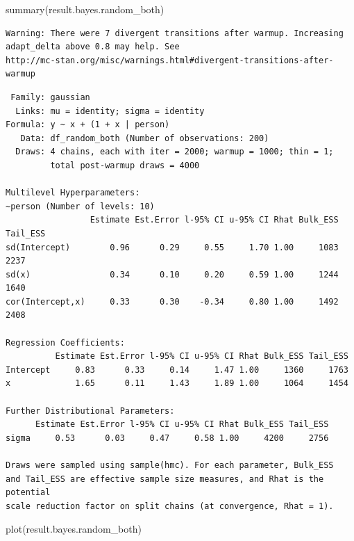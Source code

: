 \documentclass[
  a4paper,
]{ltjsbook}
\newenvironment{Shaded}{\begin{snugshade}}{\end{snugshade}}
\newcommand{\FunctionTok}[1]{\textcolor[rgb]{0.28,0.35,0.67}{#1}}
\newcommand{\NormalTok}[1]{\textcolor[rgb]{0.00,0.23,0.31}{#1}}
\begin{document}
\begin{Shaded}
\begin{Highlighting}[]
\FunctionTok{summary}\NormalTok{(result.bayes.random\_both)}
\end{Highlighting}
\end{Shaded}

\begin{verbatim}
Warning: There were 7 divergent transitions after warmup. Increasing
adapt_delta above 0.8 may help. See
http://mc-stan.org/misc/warnings.html#divergent-transitions-after-warmup
\end{verbatim}

\begin{verbatim}
 Family: gaussian 
  Links: mu = identity; sigma = identity 
Formula: y ~ x + (1 + x | person) 
   Data: df_random_both (Number of observations: 200) 
  Draws: 4 chains, each with iter = 2000; warmup = 1000; thin = 1;
         total post-warmup draws = 4000

Multilevel Hyperparameters:
~person (Number of levels: 10) 
                 Estimate Est.Error l-95% CI u-95% CI Rhat Bulk_ESS Tail_ESS
sd(Intercept)        0.96      0.29     0.55     1.70 1.00     1083     2237
sd(x)                0.34      0.10     0.20     0.59 1.00     1244     1640
cor(Intercept,x)     0.33      0.30    -0.34     0.80 1.00     1492     2408

Regression Coefficients:
          Estimate Est.Error l-95% CI u-95% CI Rhat Bulk_ESS Tail_ESS
Intercept     0.83      0.33     0.14     1.47 1.00     1360     1763
x             1.65      0.11     1.43     1.89 1.00     1064     1454

Further Distributional Parameters:
      Estimate Est.Error l-95% CI u-95% CI Rhat Bulk_ESS Tail_ESS
sigma     0.53      0.03     0.47     0.58 1.00     4200     2756

Draws were sampled using sample(hmc). For each parameter, Bulk_ESS
and Tail_ESS are effective sample size measures, and Rhat is the potential
scale reduction factor on split chains (at convergence, Rhat = 1).
\end{verbatim}

\begin{Shaded}
\begin{Highlighting}[]
\FunctionTok{plot}\NormalTok{(result.bayes.random\_both)}
\end{Highlighting}
\end{Shaded}
\end{document}
